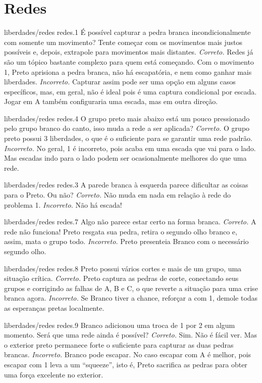 \chapter{Redes}

\emptypage

\problemAnswerDiagram
  {liberdades/redes}
  {redes.1}
  {É possível capturar a pedra branca incondicionalmente com somente um movimento? Tente começar com os movimentos mais justos possíveis e, depois, extrapole para movimentos mais distantes.}
  {\emph{Correto.} Redes já são um tópico bastante complexo para quem está começando. Com o movimento 1, Preto aprisiona a pedra branca, não há escapatória, e nem como ganhar mais liberdades.}
  {\emph{Incorreto.} Capturar assim pode ser uma opção em alguns casos específicos, mas, em geral, não é ideal pois é uma captura condicional por escada. Jogar em A também configuraria uma escada, mas em outra direção.}

\problemAnswerDiagram
  {liberdades/redes}
  {redes.4}
  {O grupo preto mais abaixo está um pouco pressionado pelo grupo branco do canto, isso muda a rede a ser aplicada?}
  {\emph{Correto.} O grupo preto possui 3 liberdades, o que é o suficiente para se garantir uma rede padrão.}
  {\emph{Incorreto.} No geral, 1 é incorreto, pois acaba em uma escada que vai para o lado. Mas escadas indo para o lado podem ser ocasionalmente melhores do que uma rede.}

\problemAnswerDiagram
  {liberdades/redes}
  {redes.3}
  {A parede branca à esquerda parece dificultar as coisas para o Preto. Ou não?}
  {\emph{Correto.} Não muda em nada em relação à rede do problema 1.}
  {\emph{Incorreto.} Não há escada!}

\problemAnswerDiagram
  {liberdades/redes}
  {redes.7}
  {Algo não parece estar certo na forma branca.}
  {\emph{Correto.} A rede não funciona! Preto resgata sua pedra, retira o segundo olho branco e, assim, mata o grupo todo.}
  {\emph{Incorreto.} Preto presenteia Branco com o necessário segundo olho.}

\problemAnswerDiagram
  {liberdades/redes}
  {redes.8}
  {Preto possui vários cortes e mais de um grupo, uma situação crítica.}
  {\emph{Correto.} Preto captura as pedras de corte, conectando seus grupos e corrigindo as falhas de A, B e C, o que reverte a situação para uma crise branca agora.}
  {\emph{Incorreto.} Se Branco tiver a chance, reforçar a com 1, demole todas as esperanças pretas localmente.}

\problemAnswerDiagram
  {liberdades/redes}
  {redes.9}
  {Branco adicionou uma troca de 1 por 2 em algum momento. Será que uma rede ainda é possível?}
  {\emph{Correto.} Sim. Não é fácil ver. Mas o exterior preto permanece forte o suficiente para capturar as duas pedras brancas.}
  {\emph{Incorreto.} Branco pode escapar. No caso escapar com A é melhor, pois escapar com 1 leva a um ``squeeze'', isto é, Preto sacrifica as pedras para obter uma força excelente no exterior.}
  
